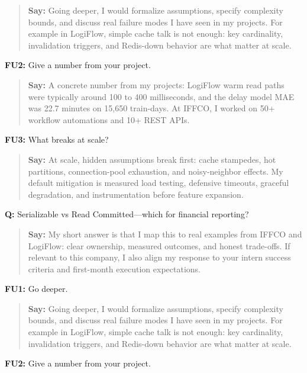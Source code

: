 \documentclass[9pt,a4paper]{article}
\begin{document}
\begin{quote}\small\textbf{Say:} Going deeper, I would formalize assumptions, specify complexity bounds, and discuss real failure modes I have seen in my projects. For example in LogiFlow, simple cache talk is not enough: key cardinality, invalidation triggers, and Redis-down behavior are what matter at scale.\end{quote}
\vspace{2mm}
\textbf{FU2:} Give a number from your project.

\begin{quote}\small\textbf{Say:} A concrete number from my projects: LogiFlow warm read paths were typically around 100 to 400 milliseconds, and the delay model MAE was 22.7 minutes on 15,650 train-days. At IFFCO, I worked on 50+ workflow automations and 10+ REST APIs.\end{quote}
\vspace{2mm}
\textbf{FU3:} What breaks at scale?

\begin{quote}\small\textbf{Say:} At scale, hidden assumptions break first: cache stampedes, hot partitions, connection-pool exhaustion, and noisy-neighbor effects. My default mitigation is measured load testing, defensive timeouts, graceful degradation, and instrumentation before feature expansion.\end{quote}
\vspace{2mm}
\textbf{Q:} Serializable vs Read Committed---which for financial reporting?

\begin{quote}\small\textbf{Say:} My short answer is that I map this to real examples from IFFCO and LogiFlow: clear ownership, measured outcomes, and honest trade-offs. If relevant to this company, I also align my response to your intern success criteria and first-month execution expectations.\end{quote}
\vspace{2mm}
\textbf{FU1:} Go deeper.

\begin{quote}\small\textbf{Say:} Going deeper, I would formalize assumptions, specify complexity bounds, and discuss real failure modes I have seen in my projects. For example in LogiFlow, simple cache talk is not enough: key cardinality, invalidation triggers, and Redis-down behavior are what matter at scale.\end{quote}
\vspace{2mm}
\textbf{FU2:} Give a number from your project.
\end{document}
